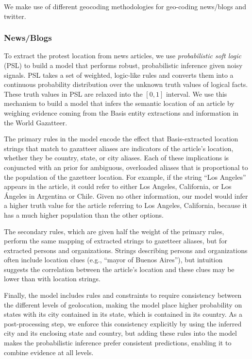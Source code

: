 We make use of different geocoding methodologies for geo-coding news/blogs and twitter.

\subsubsection{News/Blogs}

To extract the protest location from news articles, we use \emph{probabilistic soft logic} (PSL) \cite{broecheler:uai10} to build a model that performs robust, probabilistic inference given noisy signals. PSL takes a set of weighted, logic-like rules and converts them into a continuous probability distribution over the unknown truth values of logical facts. These truth values in PSL are relaxed into the $[0,1]$ interval. We use this mechanism to build a model that infers the semantic location of an article by weighing evidence coming from the Basis entity extractions and information in the World Gazatteer. 

The primary rules in the model encode the effect that Basis-extracted location strings that match to gazatteer aliases are indicators of the article's location, whether they be country, state, or city aliases. Each of these implications is conjuncted with an prior for ambiguous, overloaded aliases that is proportional to the population of the gazetteer location. For example, if the string ``Los Angeles'' appears in the article, it could refer to either Los Angeles, California, or Los \'{A}ngeles in Argentina or Chile. Given no other information, our model would infer a higher truth value for the article referring to Los Angeles, California, because it has a much higher population than the other options. 

The secondary rules, which are given half the weight of the primary rules, perform the same mapping of extracted strings to gazetteer aliases, but for extracted persons and organizations. Strings describing persons and organizations often include location clues (e.g., ``mayor of Buenos Aires''), but intuition suggests the correlation between the article's location and these clues may be lower than with location strings. 

Finally, the model includes rules and constraints to require consistency between the different levels of geolocation, making the model place higher probability on states with its city contained in its state, which is contained in its country. As a post-processing step, we enforce this consistency explicitly by using the inferred city and its enclosing state and country, but adding these rules into the model makes the probabilistic inference prefer consistent predictions, enabling it to combine evidence at all levels.


